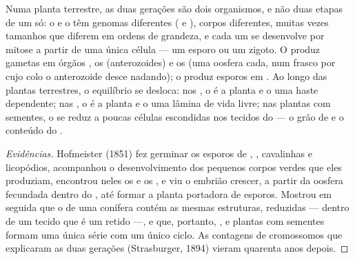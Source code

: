 \begin{proposition}\label{prop:b2:plant-life-cycles:alternation}
Numa planta terrestre, as duas gerações são dois organismos, e não
duas etapas de um só: o  e o  têm genomas
diferentes ( e ), corpos diferentes, muitas vezes
tamanhos que diferem em ordens de grandeza, e cada um se desenvolve
por mitose a partir de uma única célula --- um esporo ou um zigoto. O
 produz gametas em órgãos , os
\emph{} (anterozoides) e os \emph{} (uma oosfera
cada, num frasco por cujo colo o anterozoide desce nadando); o
 produz esporos em \emph{}. Ao longo das plantas
terrestres, o equilíbrio se desloca: nos , o  é a
planta e o  uma haste dependente; nas , o
 é a planta e o  uma lâmina de vida livre; nas
plantas com sementes, o  se reduz a poucas células
escondidas nos tecidos do  --- o grão de  e o conteúdo
do .
\end{proposition}
\begin{proof}[Evidências]
Hofmeister (1851) fez germinar os esporos de , ,
cavalinhas e licopódios, acompanhou o desenvolvimento dos pequenos
corpos verdes que eles produziam, encontrou neles os  e os
, e viu o embrião crescer, a partir da oosfera fecundada
dentro do , até formar a planta portadora de esporos. Mostrou
em seguida que o  de uma conífera contém as mesmas estruturas,
reduzidas ---  dentro de um tecido que é um 
retido ---, e que, portanto, ,  e plantas com sementes
formam uma única série com um único ciclo. As contagens de cromossomos
que explicaram as duas gerações (Strasburger, 1894) vieram quarenta
anos depois.
\end{proof}

